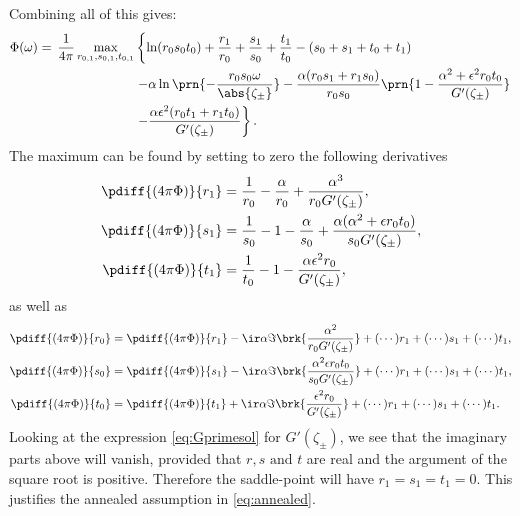 \documentclass[12pt]{article}
\begin{document}
Combining all of this gives:
%
\begin{equation}\label{eq:phimaxrep}
\begin{aligned}
  \Phi(\omega) =\, \frac{1}{4\pi} \max_{r_{0,1},s_{0,1},t_{0,1}}& \left\{
    \ln(r_0s_0t_0) + \frac{r_1}{r_0} + \frac{s_1}{s_0} + \frac{t_1}{t_0} 
    -(s_0 + s_1 + t_0 + t_1) 
    \right.\\&\left.
    - \alpha\ln\prn{-\frac{r_0s_0\omega}{\abs{\zeta_\pm}}}
    - \frac{\alpha(r_0s_1+r_1s_0)}{r_0s_0}\prn{1-\frac{\alpha^2+\epsilon^2r_0t_0} {G'(\zeta_\pm)}}
    \right.\\&\left.
    - \frac{ \alpha\epsilon^2 (r_0t_1+r_1t_0)} {G'(\zeta_\pm)}
    \right\}.
\end{aligned}
\end{equation}
%
The maximum can be found by setting to zero the following derivatives
%
\begin{equation}\label{eq:phidiff0}
\begin{aligned}
  \pdiff{(4\pi\Phi)}{r_1} &= \frac{1}{r_0} - \frac{\alpha}{r_0} + \frac{\alpha^3}{r_0G'(\zeta_\pm)},  \\
  \pdiff{(4\pi\Phi)}{s_1} &= \frac{1}{s_0} - 1 - \frac{\alpha}{s_0} + \frac{\alpha(\alpha^2+\epsilon r_0 t_0 )}{s_0G'(\zeta_\pm)},  \\
  \pdiff{(4\pi\Phi)}{t_1} &= \frac{1}{t_0} - 1 - \frac{\alpha\epsilon^2r_0}{G'(\zeta_\pm)}, 
\end{aligned}
\end{equation}
%
as well as
%
\begin{equation}\label{eq:phidiff1}
\begin{aligned}
  \pdiff{(4\pi\Phi)}{r_0} &= \pdiff{(4\pi\Phi)}{r_1} - \ir\alpha\Im\brk{\frac{\alpha^2}{r_0G'(\zeta_\pm)}} 
  +(\cdots)r_1+(\cdots)s_1+(\cdots)t_1,  \\
  \pdiff{(4\pi\Phi)}{s_0} &= \pdiff{(4\pi\Phi)}{s_1} - \ir\alpha\Im\brk{\frac{\alpha^2\epsilon r_0 t_0}{s_0G'(\zeta_\pm)}}
  +(\cdots)r_1+(\cdots)s_1+(\cdots)t_1,  \\
  \pdiff{(4\pi\Phi)}{t_0} &= \pdiff{(4\pi\Phi)}{t_1} + \ir\alpha\Im\brk{\frac{\epsilon^2r_0}{G'(\zeta_\pm)}}
  +(\cdots)r_1+(\cdots)s_1+(\cdots)t_1.
\end{aligned}
\end{equation}
%
Looking at the expression \eqref{eq:Gprimesol} for $G'(\zeta_\pm)$, we see that the imaginary parts above will vanish, provided that $r,s\text{ and }t$ are real and the argument of the square root is positive.
Therefore the saddle-point will have $r_1=s_1=t_1=0$.
This justifies the annealed assumption in \eqref{eq:annealed}.
\end{document}
